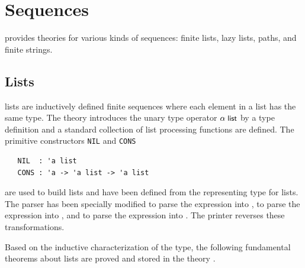 \section{Sequences}

\HOL{} provides theories for various kinds of sequences: finite lists, lazy lists,
paths, and finite strings.

\subsection{Lists}\label{avra_list}

\HOL{} lists are inductively defined finite sequences where each
element in a list has the same type. The theory  introduces
the unary type operator $\alpha \; \mbox{\small{\textbf{\sf{list}}}}$ by a type definition
and a standard collection of list processing functions are
defined. The primitive constructors {\small\verb+NIL+} and {\small\verb+CONS+}
%
\begin{hol}
\begin{verbatim}
   NIL  : 'a list
   CONS : 'a -> 'a list -> 'a list
\end{verbatim}
\end{hol}
%
are used to build lists and have been defined from the representing type for
lists. The \HOL{} parser
%
%
has been specially modified to parse the expression \holtxt{[]} into
, to parse the expression  into , and to parse the expression \holtxt{[$t_1$;$t_2$;\dots;$t_n$]}
into .  The \HOL{} printer
%
%
reverses these transformations.

Based on the inductive characterization of the type, the following
fundamental theorems about lists
are proved and stored in the theory .

